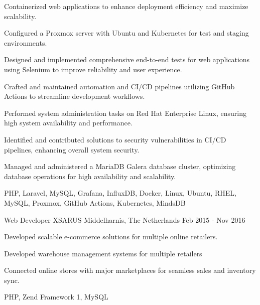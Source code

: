 \begin{cventries}
{\begin{cvitems}
        \item {Containerized web applications to enhance deployment efficiency and maximize scalability.}
        \item {Configured a Proxmox server with Ubuntu and Kubernetes for test and staging environments.}
        \item {Designed and implemented comprehensive end-to-end tests for web applications using Selenium to improve reliability and user experience.}
        \item {Crafted and maintained automation and CI/CD pipelines utilizing GitHub Actions to streamline development workflows.}
        \item {Performed system administration tasks on Red Hat Enterprise Linux, ensuring high system availability and performance.}
        \item {Identified and contributed solutions to security vulnerabilities in CI/CD pipelines, enhancing overall system security.}
        \item {Managed and administered a MariaDB Galera database cluster, optimizing database operations for high availability and scalability.}
      \end{cvitems}
    }
    {PHP, Laravel, MySQL, Grafana, InfluxDB, Docker, Linux, Ubuntu, RHEL, MySQL, Proxmox, GitHub Actions, Kubernetes, MindsDB}

\newpage

  \cventry
    {Web Developer} %
    {XSARUS} %
    {Middelharnis, The Netherlands} %
    {Feb 2015 - Nov 2016} %
    {
      \begin{cvitems} %
        \item {Developed scalable e-commerce solutions for multiple online retailers.}
        \item {Developed warehouse management systems for multiple retailers}
        \item {Connected online stores with major marketplaces for seamless sales and inventory sync.}
      \end{cvitems}
    }
    {PHP, Zend Framework 1, MySQL}


\end{cventries}
